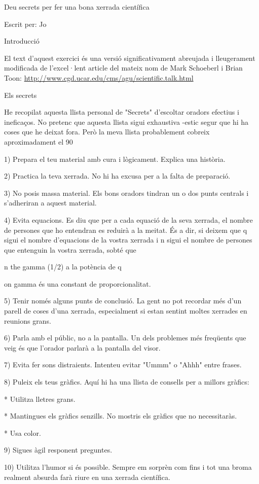 \documentclass[12pt]{article}
\begin{document}
Deu secrets per fer una bona xerrada científica

Escrit per: Jo

Introducció

El text d'aquest exercici és una versió significativament abreujada i lleugerament modificada de l'excel·lent article del mateix nom de Mark Schoeberl i Brian Toon:
\url{http://www.cgd.ucar.edu/cms/agu/scientific.talk.html}

Els secrets

He recopilat aquesta llista personal de "Secrets" d'escoltar oradors efectius i ineficaços. No pretenc que aquesta llista sigui exhaustiva -estic segur que hi ha coses que he deixat fora. Però la meva llista probablement cobreix aproximadament el 90%

1) Prepara el teu material amb cura i lògicament. Explica una història.

2) Practica la teva xerrada. No hi ha excusa per a la falta de preparació.

3) No posis massa material. Els bons oradors tindran un o dos punts centrals i s'adheriran a aquest material.

4) Evita equacions. Es diu que per a cada equació de la seva xerrada, el nombre de persones que ho entendran es reduirà a la meitat. És a dir, si deixem que q sigui el nombre d'equacions de la vostra xerrada i n sigui el nombre de persones que entenguin la vostra xerrada, sobté que

n the gamma (1/2) a la potència de q

on gamma és una constant de proporcionalitat.

5) Tenir només alguns punts de conclusió. La gent no pot recordar més d'un parell de coses d'una xerrada, especialment si estan sentint moltes xerrades en reunions grans.

6) Parla amb el públic, no a la pantalla. Un dels problemes més freqüents que veig és que l'orador parlarà a la pantalla del visor.

7) Evita fer sons distraients. Intenteu evitar "Ummm" o "Ahhh" entre frases.

8) Puleix els teus gràfics. Aquí hi ha una llista de consells per a millors gràfics:

* Utilitza lletres grans.

* Mantingues els gràfics senzills. No mostris els gràfics que no necessitaràs.

* Usa color.

9) Sigues àgil responent preguntes.

10) Utilitza l'humor si és possible. Sempre em sorprèn com fins i tot una broma realment absurda farà riure en una xerrada científica.
\end{document}
